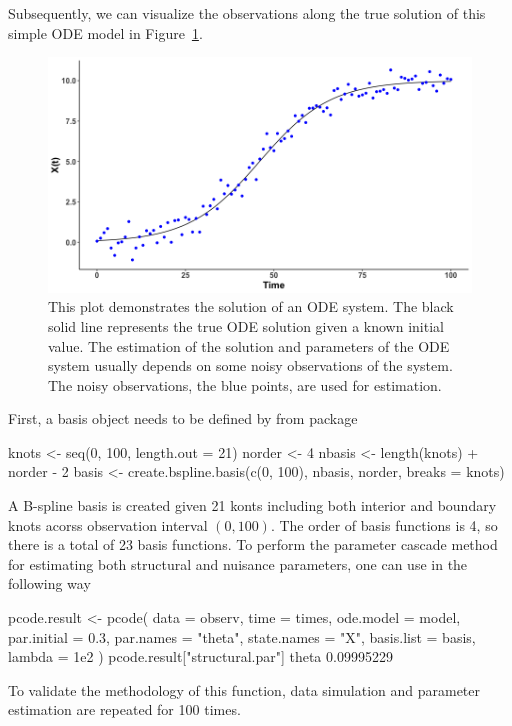 Subsequently, we can visualize the observations along the true solution of this simple ODE model in Figure~\ref{fig:simpledata}.
\begin{figure}[H]
\centering
\includegraphics[width=\textwidth]{simple_ode_observation.png}
\caption{\label{fig:simpledata} This plot demonstrates the solution of an ODE system. The black solid line represents the true ODE solution given a known initial value. The estimation of the solution and parameters of the ODE system usually depends on some noisy observations of the system. The noisy observations, the blue points, are used for estimation.}
\end{figure}
First, a basis object needs to be defined by  from  package
\begin{example*}
knots  <- seq(0, 100, length.out = 21)
norder <- 4
nbasis <- length(knots) + norder - 2
basis  <- create.bspline.basis(c(0, 100), nbasis, norder, breaks = knots)
\end{example*}
A B-spline basis is created given 21 konts including both interior and boundary knots acorss observation interval $(0,100)$. The order of basis functions is 4, so there is a total of 23 basis functions. To perform the parameter cascade method for estimating both structural and nuisance parameters, one can use  in the following way
\begin{example*}
pcode.result <- pcode(
  data = observ, time = times, ode.model = model,
  par.initial = 0.3, par.names = "theta", state.names = "X",
  basis.list = basis, lambda = 1e2
)
pcode.result["structural.par"]
theta
0.09995229
\end{example*}
To validate the methodology of this function, data simulation and parameter estimation are repeated for 100 times.
